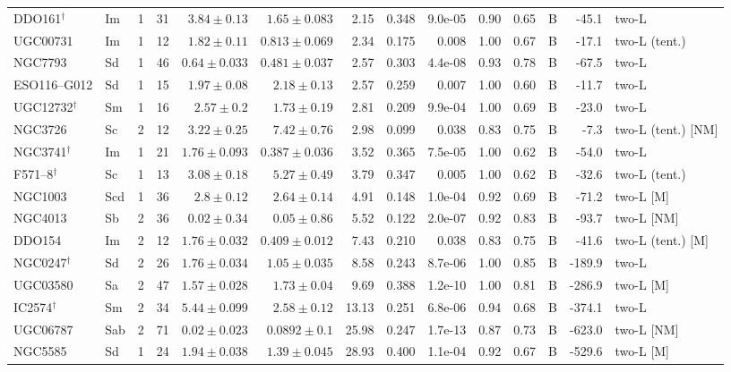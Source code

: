 \documentclass[9pt]{extarticle}
\begin{document}
{\begin{longtable}{lllrrrrrrrrcrl}
DDO161$^\dagger$ & Im & 1 & 31 & $3.84\pm0.13$ & $1.65\pm0.083$ & 2.15 & 0.348 & 9.0e-05 & 0.90 & 0.65 & B & -45.1 & two-L\\
UGC00731 & Im & 1 & 12 & $1.82\pm0.11$ & $0.813\pm0.069$ & 2.34 & 0.175 & 0.008 & 1.00 & 0.67 & B & -17.1 & two-L (tent.)\\
NGC7793 & Sd & 1 & 46 & $0.64\pm0.033$ & $0.481\pm0.037$ & 2.57 & 0.303 & 4.4e-08 & 0.93 & 0.78 & B & -67.5 & two-L\\
ESO116--G012 & Sd & 1 & 15 & $1.97\pm0.08$ & $2.18\pm0.13$ & 2.57 & 0.259 & 0.007 & 1.00 & 0.60 & B & -11.7 & two-L\\
UGC12732$^\dagger$ & Sm & 1 & 16 & $2.57\pm0.2$ & $1.73\pm0.19$ & 2.81 & 0.209 & 9.9e-04 & 1.00 & 0.69 & B & -23.0 & two-L\\
NGC3726 & Sc & 2 & 12 & $3.22\pm0.25$ & $7.42\pm0.76$ & 2.98 & 0.099 & 0.038 & 0.83 & 0.75 & B & -7.3 & two-L (tent.) [NM]\\
NGC3741$^\dagger$ & Im & 1 & 21 & $1.76\pm0.093$ & $0.387\pm0.036$ & 3.52 & 0.365 & 7.5e-05 & 1.00 & 0.62 & B & -54.0 & two-L\\
F571--8$^\dagger$ & Sc & 1 & 13 & $3.08\pm0.18$ & $5.27\pm0.49$ & 3.79 & 0.347 & 0.005 & 1.00 & 0.62 & B & -32.6 & two-L (tent.)\\
NGC1003 & Scd & 1 & 36 & $2.8\pm0.12$ & $2.64\pm0.14$ & 4.91 & 0.148 & 1.0e-04 & 0.92 & 0.69 & B & -71.2 & two-L [M]\\
NGC4013 & Sb & 2 & 36 & $0.02\pm0.34$ & $0.05\pm0.86$ & 5.52 & 0.122 & 2.0e-07 & 0.92 & 0.83 & B & -93.7 & two-L [NM]\\
DDO154 & Im & 2 & 12 & $1.76\pm0.032$ & $0.409\pm0.012$ & 7.43 & 0.210 & 0.038 & 0.83 & 0.75 & B & -41.6 & two-L (tent.) [M]\\
NGC0247$^\dagger$ & Sd & 2 & 26 & $1.76\pm0.034$ & $1.05\pm0.035$ & 8.58 & 0.243 & 8.7e-06 & 1.00 & 0.85 & B & -189.9 & two-L\\
UGC03580 & Sa & 2 & 47 & $1.57\pm0.028$ & $1.73\pm0.04$ & 9.69 & 0.388 & 1.2e-10 & 1.00 & 0.81 & B & -286.9 & two-L [M]\\
IC2574$^\dagger$ & Sm & 2 & 34 & $5.44\pm0.099$ & $2.58\pm0.12$ & 13.13 & 0.251 & 6.8e-06 & 0.94 & 0.68 & B & -374.1 & two-L\\
UGC06787 & Sab & 2 & 71 & $0.02\pm0.023$ & $0.0892\pm0.1$ & 25.98 & 0.247 & 1.7e-13 & 0.87 & 0.73 & B & -623.0 & two-L [NM]\\
NGC5585 & Sd & 1 & 24 & $1.94\pm0.038$ & $1.39\pm0.045$ & 28.93 & 0.400 & 1.1e-04 & 0.92 & 0.67 & B & -529.6 & two-L [M]\\

\end{longtable}}
\end{document}
